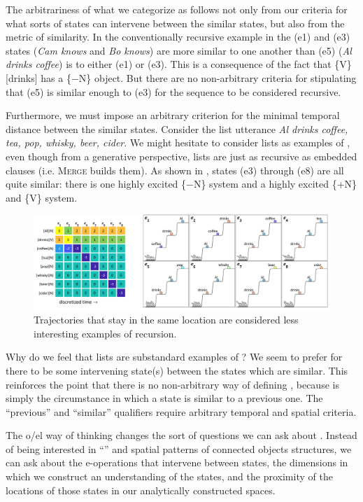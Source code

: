  The arbitrariness of what we categorize as  follows not only from our criteria for what sorts of states can intervene between the similar states, but also from the metric of similarity. In the conventionally recursive example in {} the (e1) and (e3) states (\textit{Cam knows} and \textit{Bo knows}) are more similar to one another than (e5) (\textit{Al drinks coffee}) is to either (e1) or (e3). This is a consequence of the fact that \{V\}[drinks] has a \{−N\} object. But there are no non-arbitrary criteria for stipulating that (e5) is similar enough to (e3) for the sequence to be considered recursive.

  Furthermore, we must impose an arbitrary criterion for the minimal temporal distance between the similar states. Consider the list utterance \textit{Al drinks coffee, tea, pop, whisky, beer, cider}. We might hesitate to consider lists as examples of , even though from a generative perspective, lists are just as recursive as embedded clauses (i.e. \textsc{Merge} builds them). As shown in {}, states (e3) through (e8) are all quite similar: there is one highly excited \{−N\} system and a highly excited \{+N\} and \{V\} system.

  
\begin{figure}
\includegraphics[width=\textwidth]{figures/Tilsen-img114.png}
\caption{Trajectories that stay in the same location are considered less interesting examples of recursion.}
\label{fig:5:10}
\end{figure}
 

  Why do we feel that lists are substandard examples of ? We seem to prefer for there to be some intervening state(s) between the states which are similar. This reinforces the point that there is no non-arbitrary way of defining , because  is simply the circumstance in which a state is similar to a previous one. The “previous” and “similar” qualifiers require arbitrary temporal and spatial criteria. 

  The o/el way of thinking changes the sort of questions we can ask about . Instead of being interested in “” and spatial patterns of connected objects structures, we can ask about the e-operations that intervene between states, the dimensions in which we construct an understanding of the states, and the proximity of the locations of those states in our analytically constructed spaces.

